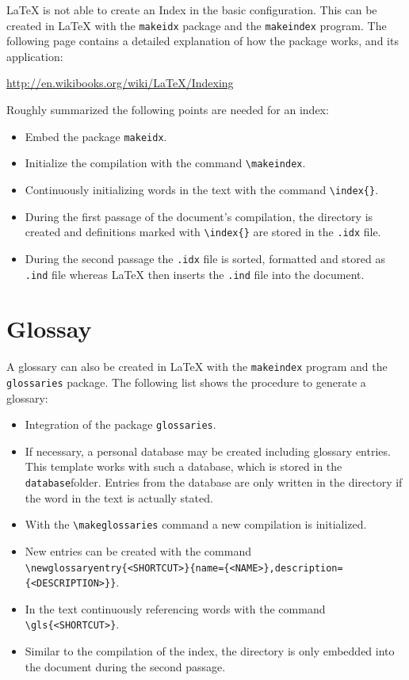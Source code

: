 \LaTeX{} is not able to create an \gls{Index} in the basic configuration. This can be created in \LaTeX{} with the \texttt{makeidx} package and the \texttt{makeindex} program. The following page contains a detailed explanation of how the package works, and its application:

\begin{center}
	\url{http://en.wikibooks.org/wiki/LaTeX/Indexing}
\end{center}

Roughly summarized the following points are needed for an index:

\begin{itemize}
	\item Embed the package \texttt{makeidx}.
	\item Initialize the compilation with the command \texttt{\textbackslash makeindex}.
	\item Continuously initializing words in the text with the command \texttt{\textbackslash index\{\}}.
	\item During the first passage of the document's compilation, the directory is created and definitions marked with \texttt{\textbackslash index\{\}} are stored in the \texttt{.idx} file.
	\item During the second passage the \texttt{.idx} file is sorted, formatted and stored as \texttt{.ind} file whereas \LaTeX{} then inserts the \texttt{.ind} file into the document.
\end{itemize}

\section{Glossay}
\label{sec:instructions_glossay}

A glossary can also be created in \LaTeX{} with the \texttt{makeindex} program and the \texttt{glossaries} package. The following list shows the procedure to generate a glossary:

\begin{itemize}
	\item Integration of the package \texttt{glossaries}.
	\item If necessary, a personal database may be created including glossary entries. This template works with such a database, which is stored in the \texttt{database}folder. Entries from the database are only written in the directory if the word in the text is actually stated.
	\item With the \texttt{\textbackslash makeglossaries} command a new compilation is initialized.
	\item New entries can be created with the command \\ \texttt{\textbackslash newglossaryentry\{<SHORTCUT>\}\{name=\{<NAME>\},description=\{<DESCRIPTION>\}\}}.
	\item In the text continuously referencing words with the command \texttt{\textbackslash gls\{<SHORTCUT>\}}.
	\item Similar to the compilation of the index, the directory is only embedded into the document  during the second passage.
\end{itemize}


